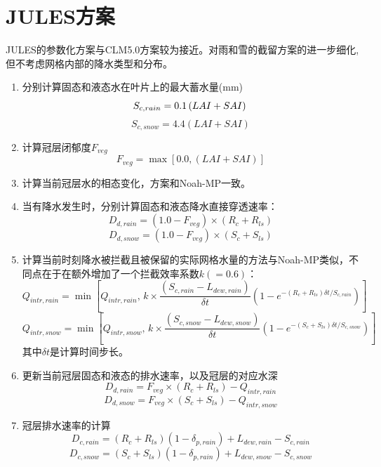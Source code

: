 \section{JULES方案}
JULES的参数化方案与CLM5.0方案较为接近。对雨和雪的截留方案的进一步细化,但不考虑网格内部的降水类型和分布。
\begin{enumerate}
\item 分别计算固态和液态水在叶片上的最大蓄水量(mm)\\
\begin{equation}
S_{c,rain}=0.1\left(LAI+SAI\right)\\
\end{equation}
\begin{equation}
S_{c,snow}=4.4\left(LAI+SAI\right)
\end{equation}
\item 计算冠层闭郁度$F_{veg}$
\begin{equation}
F_{veg} = \max\left[0.0,\left(LAI+SAI\right)\right]
\end{equation}

\item 计算当前冠层水的相态变化，方案和Noah-MP一致。

\item 当有降水发生时，分别计算固态和液态降水直接穿透速率：
\begin{equation}
D_{d,rain}=\left(1.0-F_{veg}\right) \times (R_{c}+R_{ls})
\end{equation}
\begin{equation}
D_{d,snow}=\left(1.0-F_{veg}\right) \times (S_{c}+S_{ls})
\end{equation}
\item 计算当前时刻降水被拦截且被保留的实际网格水量的方法与Noah-MP类似，不同点在于在额外增加了一个拦截效率系数$k(=0.6)$：
\begin{equation}
Q_{intr,rain} = \min\left[Q_{intr,rain},\,  k \times \frac{(S_{c,rain} - L_{dew,rain})}{\delta{t}} \left(1-e^{-\left(R_{c}+R_{ls}\right)\delta{t}/S_{c,rain}}\right)\right]
\end{equation}
\begin{equation}
Q_{intr,snow} = \min\left[Q_{intr,snow},\, k \times \frac{(S_{c,snow} - L_{dew,snow})}{\delta{t}}\left(1-e^{-\left(S_{c}+S_{ls}\right)\delta{t}/S_{c,snow}}\right)\right]
\end{equation}
其中${\delta{t}}$是计算时间步长。
\item 更新当前冠层固态和液态的排水速率，以及冠层的对应水深
\begin{equation}
D_{d,rain}=F_{veg} \times (R_{c}+R_{ls})-Q_{intr,rain}
\end{equation}
\begin{equation}
D_{d,snow}=F_{veg} \times (S_{c}+S_{ls})-Q_{intr,snow}
\end{equation}
\item 冠层排水速率的计算
\begin{equation}
D_{c,rain}=\left(R_{c}+R_{ls}\right)\left(1-\delta_{p,rain}\right)+L_{dew,rain}-S_{c,rain}
\end{equation}
\begin{equation}
D_{c,snow}=\left(S_{c}+S_{ls}\right)\left(1-\delta_{p,rain}\right)+L_{dew,snow}-S_{c,snow}
\end{equation}

\end{enumerate}






